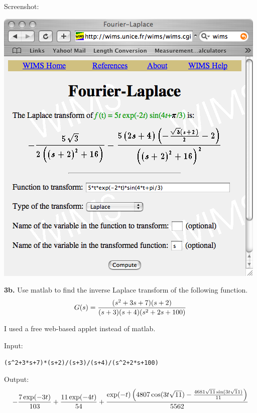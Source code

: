 \documentclass[11pt]{report}
\begin{document}
\bigskip
\noindent
Screenshot:
\begin{center}
\includegraphics[scale=0.5]{images/laplace-tool.png}
\end{center}

\newpage

\noindent
{\bf 3b.} Use {\sc matlab} to find the inverse Laplace transform of the following
function.
$$G(s)={(s^2+3s+7)(s+2)\over(s+3)(s+4)(s^2+2s+100)}$$

\bigskip
\noindent
I used a free web-based applet instead of {\sc matlab}.

\bigskip
\noindent
Input:
\begin{center}
\verb$(s^2+3*s+7)*(s+2)/(s+3)/(s+4)/(s^2+2*s+100)$
\end{center}

\bigskip
\noindent
Output:
$$-{7\exp(-3t)\over103}
+{11\exp(-4t)\over54}
+{\exp(-t)
\left(4807\cos(3t\sqrt{11})-{4681\sqrt{11}\sin(3t\sqrt11)\over11}\right)
\over5562}$$
\end{document}
